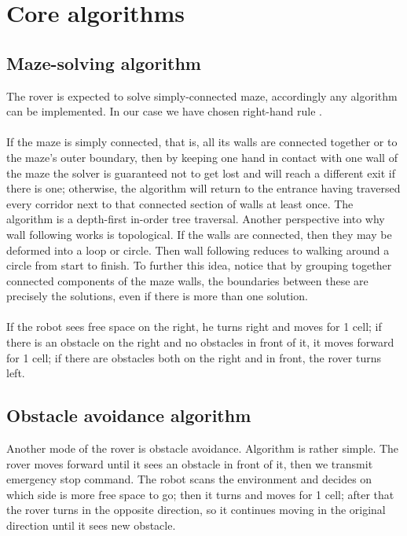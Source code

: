 \documentclass[]{IEEEphot}
\begin{document}
\section{Core algorithms}

\subsection{Maze-solving algorithm}
The rover is expected to solve simply-connected maze, accordingly any algorithm can be implemented. In our case we have chosen right-hand rule \cite{aleiunas1979}.
\\\\
If the maze is simply connected, that is, all its walls are connected together or to the maze's outer boundary, then by keeping one hand in contact with one wall of the maze the solver is guaranteed not to get lost and will reach a different exit if there is one; otherwise, the algorithm will return to the entrance having traversed every corridor next to that connected section of walls at least once. The algorithm is a depth-first in-order tree traversal. Another perspective into why wall following works is topological. If the walls are connected, then they may be deformed into a loop or circle. Then wall following reduces to walking around a circle from start to finish. To further this idea, notice that by grouping together connected components of the maze walls, the boundaries between these are precisely the solutions, even if there is more than one solution.
\\\\
If the robot sees free space on the right, he turns right and moves for 1 cell; if there is an obstacle on the right and no obstacles in front of it, it moves forward for 1 cell; if there are obstacles both on the right and in front, the rover turns left.

\subsection{Obstacle avoidance algorithm}

Another mode of the rover is obstacle avoidance. Algorithm is rather simple. The rover moves forward until it sees an obstacle in front of it, then we transmit emergency stop command. The robot scans the environment and decides on which side is more free space to go; then it turns and moves for 1 cell; after that the rover turns in the opposite direction, so it continues moving in the original direction until it sees new obstacle.
\end{document}
